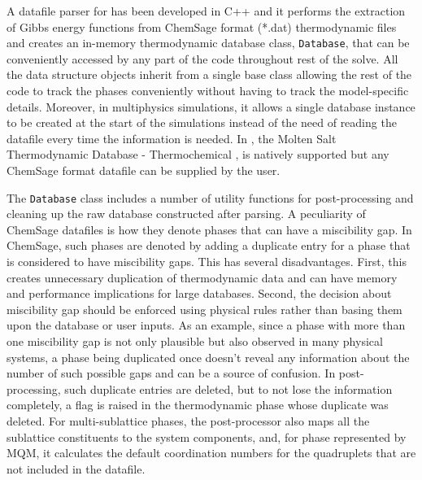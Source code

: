 	A datafile parser for {\GEM} has been developed in C++ and it performs the extraction of Gibbs energy functions from ChemSage format (*.dat) thermodynamic files and creates an in-memory thermodynamic database class, \texttt{Database}, that can be conveniently accessed by any part of the code throughout rest of the solve. All the data structure objects inherit from a single base class allowing the rest of the code to track the phases conveniently without having to track the model-specific  details. Moreover, in multiphysics simulations, it allows a single database instance to be created at the start of the simulations instead of the need of reading the datafile every time the information is needed. In {\GEM}, the Molten Salt Thermodynamic Database - Thermochemical \cite{Besmann:2021aa,Ard:2022aa}, is natively supported but any ChemSage format datafile can be supplied by the user.
	
	The \texttt{Database} class includes a number of utility functions for post-processing and cleaning up the raw database constructed after parsing. A peculiarity of ChemSage datafiles is how they denote phases that can have a miscibility gap. In ChemSage, such phases are denoted by adding a duplicate entry for a phase that is considered to have miscibility gaps. This has several disadvantages. First, this creates unnecessary duplication of thermodynamic data and can have memory and performance implications for large databases. Second, the decision about miscibility gap should be enforced using physical rules rather than basing them upon the database or user inputs. As an example, since a phase with more than one miscibility gap is not only plausible but also observed in many physical systems, a phase being duplicated once doesn't reveal any information about the number of such possible gaps and can be a source of confusion. In post-processing, such duplicate entries are deleted, but to not lose the information completely, a flag is raised in the thermodynamic phase whose duplicate was deleted. For multi-sublattice phases, the post-processor also maps all the sublattice constituents to the system components, and, for phase represented by MQM, it calculates the default coordination numbers for the quadruplets that are not included in the datafile.
	
